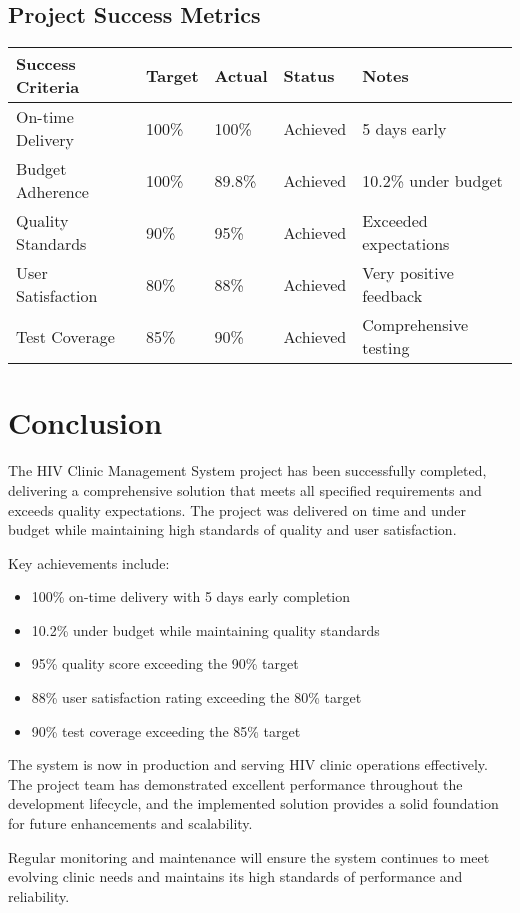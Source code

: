 \documentclass[12pt,a4paper]{article}
\begin{document}
\subsection{Project Success Metrics}
\begin{longtable}{|p{4cm}|p{3cm}|p{3cm}|p{3cm}|p{3cm}|}
\hline
\rowcolor{lightgray}
\textbf{Success Criteria} & \textbf{Target} & \textbf{Actual} & \textbf{Status} & \textbf{Notes} \\
\hline
On-time Delivery & 100\% & 100\% & \cellcolor{completedgreen}Achieved & 5 days early \\
\hline
Budget Adherence & 100\% & 89.8\% & \cellcolor{completedgreen}Achieved & 10.2\% under budget \\
\hline
Quality Standards & 90\% & 95\% & \cellcolor{completedgreen}Achieved & Exceeded expectations \\
\hline
User Satisfaction & 80\% & 88\% & \cellcolor{completedgreen}Achieved & Very positive feedback \\
\hline
Test Coverage & 85\% & 90\% & \cellcolor{completedgreen}Achieved & Comprehensive testing \\
\hline
\end{longtable}

\section{Conclusion}

The HIV Clinic Management System project has been successfully completed, delivering a comprehensive solution that meets all specified requirements and exceeds quality expectations. The project was delivered on time and under budget while maintaining high standards of quality and user satisfaction.

Key achievements include:
\begin{itemize}
    \item 100\% on-time delivery with 5 days early completion
    \item 10.2\% under budget while maintaining quality standards
    \item 95\% quality score exceeding the 90\% target
    \item 88\% user satisfaction rating exceeding the 80\% target
    \item 90\% test coverage exceeding the 85\% target
\end{itemize}

The system is now in production and serving HIV clinic operations effectively. The project team has demonstrated excellent performance throughout the development lifecycle, and the implemented solution provides a solid foundation for future enhancements and scalability.

Regular monitoring and maintenance will ensure the system continues to meet evolving clinic needs and maintains its high standards of performance and reliability.
\end{document}
